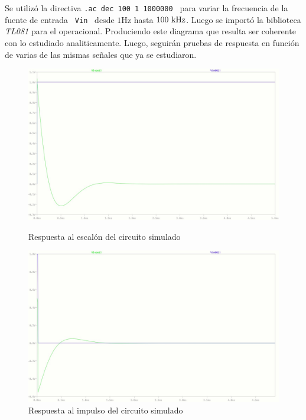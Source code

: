 	
Se utiliz\'o la directiva \texttt{.ac dec 100 1 1000000 } para
variar la  frecuencia de la fuente de entrada \texttt{ Vin } desde  $1 \si{\hertz}$ hasta $100 \ \si{\kilo\hertz}$. Luego se import\'o la biblioteca \textit{TL081} para el operacional. Produciendo este diagrama que resulta ser coherente con lo estudiado analiticamente.
Luego, seguir\'an pruebas de respuesta en funci\'on de varias de las mismas señales que ya se estudiaron.

\begin{figure}[h]
\begin{centering}

	\begin{minipage}[b]{.4\linewidth}
	\centering
	\includegraphics[width=1.3\linewidth]{imagenes/StepSimulacion}
	\caption{Respuesta al escal\'on del circuito simulado}
	\end{minipage}
	\hfill
	\begin{minipage}[b]{.4\linewidth}
	\centering
	\includegraphics[width=1.3\linewidth]{imagenes/ImpulseSimulacion}
	\caption{Respuesta al impulso del circuito simulado}
	\end{minipage}
\end{centering}
\end{figure}


